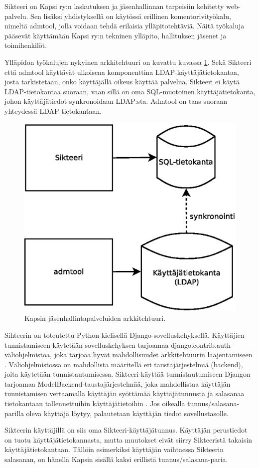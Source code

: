 Sikteeri on Kapsi ry:n laskutuksen ja jäsenhallinnan tarpeisiin kehitetty web-palvelu. Sen lisäksi yhdistyksellä on käytössä erillinen komentorivityökalu, nimeltä admtool, jolla voidaan tehdä erilaisia ylläpitotehtäviä. Näitä työkaluja pääsevät käyttämään Kapsi ry:n tekninen ylläpito, hallituksen jäsenet ja toimihenkilöt.

Ylläpidon työkalujen nykyinen arkkitehtuuri on kuvattu kuvassa \ref{kapsi_nykyinen}. Sekä Sikteeri että admtool käyttävät ulkoisena komponenttina LDAP-käyt\-tä\-jä\-tie\-to\-kan\-taa, josta tarkistetaan, onko käyttäjällä oikeus käyttää palvelua. Sikteeri ei käytä LDAP-tietokantaa suoraan, vaan sillä on oma SQL-muotoinen käyttäjätietokanta, johon käyttäjätiedot synkronoidaan LDAP:sta. Admtool on taas suoraan yhteydessä LDAP-tietokantaan.

\begin{figure}[h]
\centering
\includegraphics[width=.6\textwidth]{toteutus/kapsi_nykyinen.eps}
\caption{Kapsin jäsenhallintapalveluiden arkkitehtuuri.}%
\label{kapsi_nykyinen}
\end{figure}

Sihteerin on toteutettu Python-kielisellä Django-so\-vel\-lus\-ke\-hyk\-sel\-lä. Käyttäjien tunnistamiseen käytetään sovelluskehyksen tarjoamaa django.contrib.auth-vä\-li\-oh\-jel\-mis\-to\-a, joka tarjoaa hyvät mahdollisuudet arkkitehtuurin laajentamiseen \cite{django_auth}. Väliohjelmistossa on mahdollista määritellä eri taustajärjestelmiä (backend), joita käytetään tunnistautumisessa. Sikteeri käyttää tunnistautumiseen Djangon tarjoamaa ModelBackend-taustajärjestelmää, joka mahdollistaa käyttäjän tunnistamisen vertaamalla käyttäjän syöttämää käyttäjätunnusta ja salasanaa tietokantaan tallennettuihin käyttäjätietoihin \cite{django_auth}. Jos oikealla tunnus/salasana-parilla oleva käyttäjä löytyy, palautetaan käyttäjän tiedot sovellustasolle.

Sikteerin käyttäjillä on siis oma Sikteeri-käyttäjätunnus. Käyttäjän perustiedot on tuotu käyttäjätietokannasta, mutta muutokset eivät siirry Sikteeristä takaisin käyttäjätietokantaan. Tällöin esimerkiksi käyttäjän vaihtaessa Sikteerin salasanan, on hänellä Kapsin sisällä kaksi erillistä tunnus/salasana-paria.